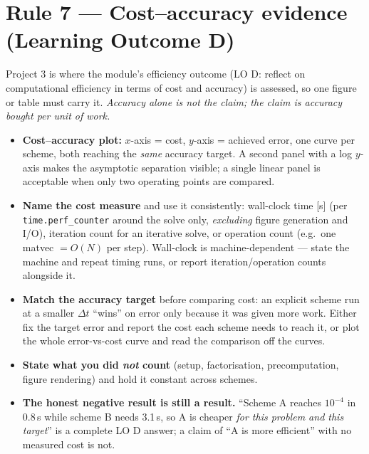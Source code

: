 \documentclass[11pt]{article}
\begin{document}
\section*{Rule 7 --- Cost--accuracy evidence (Learning Outcome D)}

Project 3 is where the module's efficiency outcome (LO D: reflect on
computational efficiency in terms of cost and accuracy) is assessed, so one
figure or table must carry it. \emph{Accuracy alone is not the claim; the
claim is accuracy bought per unit of work.}

\begin{itemize}[leftmargin=2em, itemsep=1pt]
  \item\textbf{Cost--accuracy plot:} $x$-axis = cost, $y$-axis = achieved
        error, one curve per scheme, both reaching the \emph{same} accuracy
        target. A second panel with a log $y$-axis makes the asymptotic
        separation visible; a single linear panel is acceptable when only
        two operating points are compared.
  \item\textbf{Name the cost measure} and use it consistently: wall-clock
        time [s] (per \texttt{time.perf\_counter} around the solve only,
        \emph{excluding} figure generation and I/O), iteration count for an
        iterative solve, or operation count (e.g.\ one matvec $=O(N)$ per
        step). Wall-clock is machine-dependent --- state the machine and
        repeat timing runs, or report iteration/operation counts alongside it.
  \item\textbf{Match the accuracy target} before comparing cost: an explicit
        scheme run at a smaller $\Delta t$ ``wins'' on error only because it
        was given more work. Either fix the target error and report the cost
        each scheme needs to reach it, or plot the whole error-vs-cost curve
        and read the comparison off the curves.
  \item\textbf{State what you did \emph{not} count} (setup, factorisation,
        precomputation, figure rendering) and hold it constant across schemes.
  \item\textbf{The honest negative result is still a result.} ``Scheme A
        reaches $10^{-4}$ in 0.8\,s while scheme B needs 3.1\,s, so A is
        cheaper \emph{for this problem and this target}'' is a complete LO D
        answer; a claim of ``A is more efficient'' with no measured cost is not.
\end{itemize}
\end{document}
